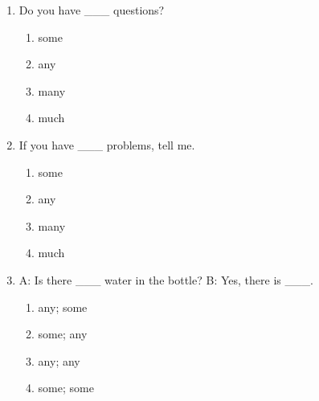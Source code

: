 \documentclass[11pt,a4paper]{ctexart}
\begin{document}
\begin{enumerate}[leftmargin=*,itemsep=4pt]
\begin{enumerate}[label=\Alph*.,leftmargin=2em,itemsep=1pt,topsep=2pt]
\end{enumerate}
\item Do you have \_\_\_ questions?
\begin{enumerate}[label=\Alph*.,leftmargin=2em,itemsep=1pt,topsep=2pt]
\item some
\item any
\item many
\item much
\end{enumerate}
\item If you have \_\_\_ problems, tell me.
\begin{enumerate}[label=\Alph*.,leftmargin=2em,itemsep=1pt,topsep=2pt]
\item some
\item any
\item many
\item much
\end{enumerate}
\item A: Is there \_\_\_ water in the bottle? B: Yes, there is \_\_\_.
\begin{enumerate}[label=\Alph*.,leftmargin=2em,itemsep=1pt,topsep=2pt]
\item any; some
\item some; any
\item any; any
\item some; some
\end{enumerate}
\end{enumerate}
\end{document}
